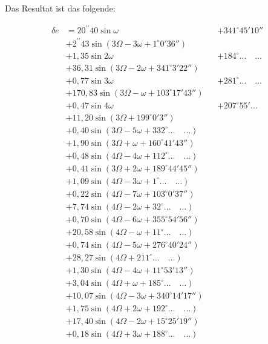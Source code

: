 \documentclass[10pt,a4paper]{article}
\begin{document}
Das Resultat ist das folgende:

\begin{align*}
\delta e &= 20^{\prime\prime}40 \sin \omega &&+ 341^{\circ}45'10'' \\
&+ 2^{\prime\prime}43 \sin(3\Omega - 3\omega + 1^{\circ}0'36'') \\
&+ 1,35 \sin 2\omega &&+ 184^{\circ}\ldots \quad \ldots \\
&+ 36,31 \sin(3\Omega - 2\omega + 341^{\circ}3'22'') \\
&+ 0,77 \sin 3\omega &&+ 281^{\circ}\ldots \quad \ldots \\
&+ 170,83 \sin(3\Omega - \omega + 103^{\circ}17'43'') \\
&+ 0,47 \sin 4\omega &&+ 207^{\circ}55'\ldots \\
&+ 11,20 \sin(3\Omega + 199^{\circ}0'3'') \\
&+ 0,40 \sin(3\Omega - 5\omega + 332^{\circ}\ldots \quad \ldots) \\
&+ 1,90 \sin(3\Omega + \omega + 160^{\circ}41'43'') \\
&+ 0,48 \sin(4\Omega - 4\omega + 112^{\circ}\ldots \quad \ldots) \\
&+ 0,41 \sin(3\Omega + 2\omega + 189^{\circ}44'45'') \\
&+ 1,09 \sin(4\Omega - 3\omega + 1^{\circ}\ldots \quad \ldots) \\
&+ 0,22 \sin(4\Omega - 7\omega + 103^{\circ}0'37'') \\
&+ 7,74 \sin(4\Omega - 2\omega + 32^{\circ}\ldots \quad \ldots) \\
&+ 0,70 \sin(4\Omega - 6\omega + 355^{\circ}54'56'') \\
&+ 20,58 \sin(4\Omega - \omega + 11^{\circ}\ldots \quad \ldots) \\
&+ 0,74 \sin(4\Omega - 5\omega + 276^{\circ}40'24'') \\
&+ 28,27 \sin(4\Omega + 211^{\circ}\ldots \quad \ldots) \\
&+ 1,30 \sin(4\Omega - 4\omega + 11^{\circ}53'13'') \\
&+ 3,04 \sin(4\Omega + \omega + 185^{\circ}\ldots \quad \ldots) \\
&+ 10,07 \sin(4\Omega - 3\omega + 340^{\circ}14'17'') \\
&+ 1,75 \sin(4\Omega + 2\omega + 192^{\circ}\ldots \quad \ldots) \\
&+ 17,40 \sin(4\Omega - 2\omega + 15^{\circ}25'19'') \\
&+ 0,18 \sin(4\Omega + 3\omega + 188^{\circ}\ldots \quad \ldots) \\

\end{align*}
\end{document}

